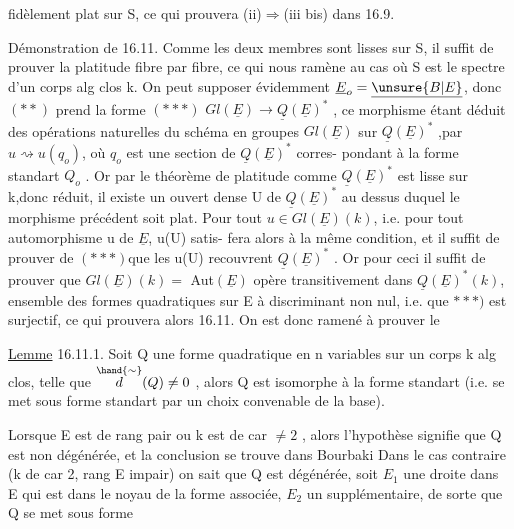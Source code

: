 
fidèlement plat sur S, ce qui prouvera  (ii)$\Longrightarrow$(iii bis) dans  16.9.

Démonstration de 16.11.  Comme les deux membres sont lisses sur S,
il suffit de prouver la platitude fibre par fibre, ce qui nous ramène au
cas où S est le spectre d'un corps alg clos k.  On peut  supposer
évidemment $\underline{E}_o=\underline{\unsure{B|E}}$, donc $(**)$ prend la forme
$(***)$   $Gl(\underline{E})\longrightarrow\underline{Q}(\underline{E})^*$ ,
ce morphisme étant déduit des opérations naturelles du schéma en groupes
$Gl(\underline{E})$ sur $\underline{Q}(\underline{E})^*$ ,par $u\rightsquigarrow u(q_o)$, où $q_o$ est une section de $\underline{Q}(\underline{E})^*$ corres-%
pondant à la forme standart $Q_o$ . Or par le théorème de platitude \hand{,}
comme $\underline{Q}(\underline{E})^*$ est lisse sur k,donc réduit, il existe un ouvert dense U de
$\underline{Q}(\underline{E})^*$ au dessus duquel le morphisme précédent soit plat.  Pour tout 
$u\in Gl(\underline{E})(k)$, i.e. pour tout automorphisme u de $\underline{E}$, u(U) satis-%
fera alors à la même condition, et il suffit\hand{,} de prouver\hand{),} 
de $(***)$\hand{,}que les u(U) recouvrent $\underline{Q}(\underline{E})^*$ . Or pour ceci il suffit de prouver
que $Gl(\underline{E})(k)=$ Aut$(\underline{E})$ opère transitivement dans $\underline{Q}(\underline{E})^*(k)$, ensemble des
formes quadratiques  sur \hand{$\checkmark$}E à discriminant non nul,  i.e. que
\deleted{(}$***)$ est surjectif, ce \hand{\unsure{|}}qui prouvera alors 16.11.  On est donc ramené à
prouver le

\uline{Lemme} 16.11.1.  Soit Q une forme quadratique en n variables sur un corps k
alg clos, telle que $\overset{\hand{\sim}}{d}(Q)\neq 0$ , alors Q est isomorphe à la forme standart
(i.e. se met sous forme standart par un choix convenable de la base).

Lorsque E est de rang pair ou k est de car $\neq 2$ , alors l'hypothèse
signifie que Q est non dégénérée, et la conclusion se trouve dans Bourbaki
Dans le cas contraire (k de car 2,  rang E impair)  on sait que Q est
dégénérée,  soit $E_1$ une droite dans E qui est dans le noyau de la
forme associée, $E_2$ un supplémentaire, de sorte que Q se met sous forme

